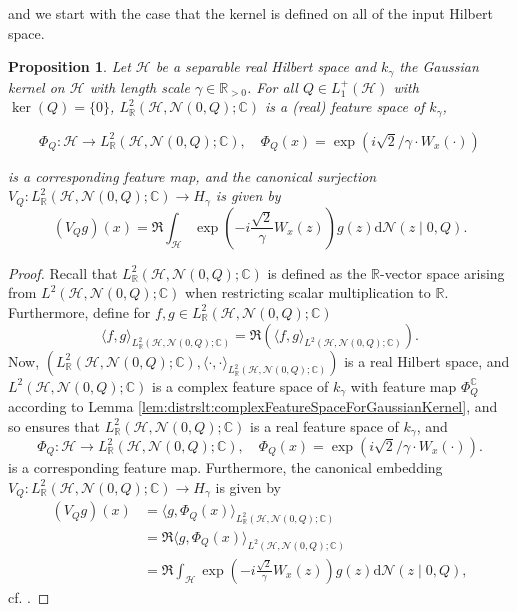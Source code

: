 \documentclass[letterpaper]{article} %
\newcommand{\R}{\mathbb{R}}
\newcommand{\Rp}{\R_{> 0}}
\newcommand{\fm}{\Phi} %
\newcommand{\hs}[1]{\mathcal{#1}} %
\newcommand{\scp}{\langle\cdot,\cdot\rangle}
\newcommand{\Normal}{\mathcal{N}}
\newcommand{\C}{\mathbb{C}}
\newcommand{\gaussianKernel}[1]{k_{#1}}
\newtheorem{proposition}[theorem]{Proposition}
\newif\ifTwoColumns
\begin{document}
and we start with the case that the kernel is defined on all of the input Hilbert space.
\begin{proposition} \label{prop:distrslt:featureSpaceGaussianKernelOnAllofHS}
Let $\hs{H}$ be a separable real Hilbert space and $\gaussianKernel{\gamma}$ the Gaussian kernel on $\hs{H}$ with length scale $\gamma\in\Rp$.
For all $Q\in L_1^+(\hs{H})$ with $\ker(Q)=\{0\}$, $L^2_\R(\hs{H},\Normal(0,Q);\C)$ is a (real) feature space of $k_\gamma$,
\ifTwoColumns
$\fm_Q: \hs{H}\rightarrow L^2_\R(\hs{H},\Normal(0,Q);\C)$ defined by
\begin{equation}
    \fm_Q(x) = \exp(i \sqrt{2}/\gamma \cdot W_x(\cdot))
\end{equation}
\else
\begin{equation}
    \fm_Q: \hs{H}\rightarrow L^2_\R(\hs{H},\Normal(0,Q);\C),
    \quad
    \fm_Q(x) = \exp(i \sqrt{2}/\gamma \cdot W_x(\cdot))
\end{equation}
\fi
is a corresponding feature map, 
and the canonical surjection $V_Q: L^2_\R(\hs{H},\Normal(0,Q);\C) \rightarrow H_\gamma$ is given by
\begin{equation}
    (V_Qg)(x) = \Re \int_\hs{H} \exp\left(-i \frac{\sqrt{2}}{\gamma} W_x(z)\right)g(z)\mathrm{d}\Normal(z\mid 0, Q).
\end{equation}
\end{proposition}
\begin{proof}
Recall that $L^2_\R(\hs{H},\Normal(0,Q);\C)$ is defined as the $\R$-vector space arising from $L^2(\hs{H},\Normal(0,Q);\C)$ when restricting scalar multiplication to $\R$.
Furthermore, define for $f,g\in L^2_\R(\hs{H},\Normal(0,Q);\C)$
\begin{equation}
    \langle f, g\rangle_{L^2_\R(\hs{H},\Normal(0,Q);\C)} = \Re\left( \langle f, g\rangle_{L^2(\hs{H},\Normal(0,Q);\C)}\right).
\end{equation}
Now, $(L^2_\R(\hs{H},\Normal(0,Q);\C), \scp_{L^2_\R(\hs{H},\Normal(0,Q);\C)})$ is a real Hilbert space,
and $L^2(\hs{H},\Normal(0,Q);\C)$ is a complex feature space of $k_\gamma$ with feature map $\fm_Q^\C$ according to Lemma \ref{lem:distrslt:complexFeatureSpaceForGaussianKernel},
and so \cite[Lemma~4.4]{SC08} ensures that $L^2_\R(\hs{H},\Normal(0,Q);\C)$ is a real feature space of $k_\gamma$, and 
\begin{equation}
    \fm_Q: \hs{H}\rightarrow L^2_\R(\hs{H},\Normal(0,Q);\C),
    \quad
    \fm_Q(x) = \exp(i \sqrt{2}/\gamma \cdot W_x(\cdot)).
\end{equation}
is a corresponding feature map.
Furthermore, the canonical embedding
$V_Q: L^2_\R(\hs{H},\Normal(0,Q);\C) \rightarrow H_\gamma$ is given by
\begin{align*}
    (V_Qg)(x) & = \langle g, \fm_Q(x)\rangle_{L^2_\R(\hs{H},\Normal(0,Q);\C)}\\
    & = \Re  \langle g, \fm_Q(x)\rangle_{L^2(\hs{H},\Normal(0,Q);\C)} \\
    & = \Re \int_\hs{H} \exp\left(-i \frac{\sqrt{2}}{\gamma} W_x(z)\right)g(z)\mathrm{d}\Normal(z\mid 0, Q),
\end{align*}
cf. \cite[Theorem~4.21]{SC08}.
\end{proof}
\end{document}
